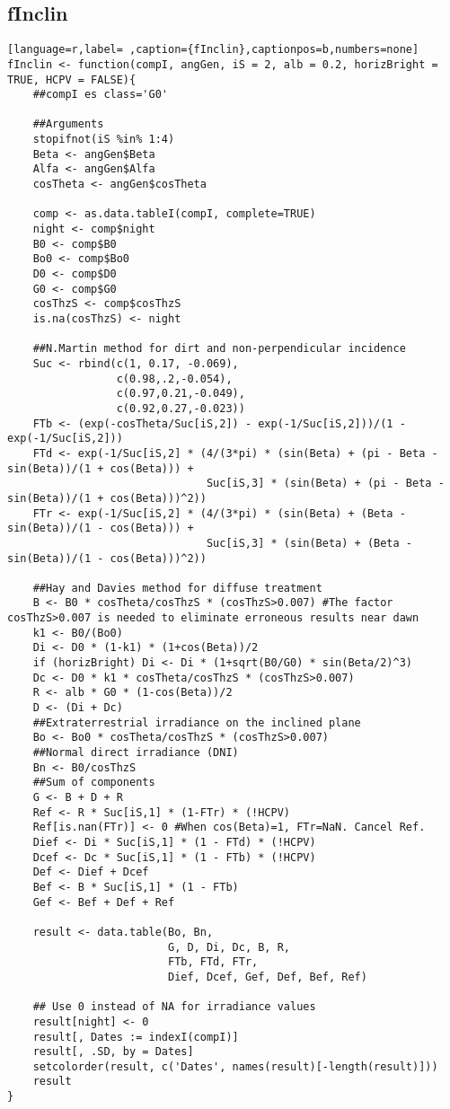 \subsection{fInclin}
\label{sec:org401130c}
\label{subsec:finclin}
\begin{lstlisting}[language=r,label= ,caption={fInclin},captionpos=b,numbers=none]
fInclin <- function(compI, angGen, iS = 2, alb = 0.2, horizBright = TRUE, HCPV = FALSE){
    ##compI es class='G0'

    ##Arguments
    stopifnot(iS %in% 1:4)
    Beta <- angGen$Beta
    Alfa <- angGen$Alfa
    cosTheta <- angGen$cosTheta

    comp <- as.data.tableI(compI, complete=TRUE)
    night <- comp$night
    B0 <- comp$B0
    Bo0 <- comp$Bo0
    D0 <- comp$D0
    G0 <- comp$G0
    cosThzS <- comp$cosThzS
    is.na(cosThzS) <- night

    ##N.Martin method for dirt and non-perpendicular incidence
    Suc <- rbind(c(1, 0.17, -0.069),
                 c(0.98,.2,-0.054),
                 c(0.97,0.21,-0.049),
                 c(0.92,0.27,-0.023))
    FTb <- (exp(-cosTheta/Suc[iS,2]) - exp(-1/Suc[iS,2]))/(1 - exp(-1/Suc[iS,2]))
    FTd <- exp(-1/Suc[iS,2] * (4/(3*pi) * (sin(Beta) + (pi - Beta - sin(Beta))/(1 + cos(Beta))) +
                               Suc[iS,3] * (sin(Beta) + (pi - Beta - sin(Beta))/(1 + cos(Beta)))^2))
    FTr <- exp(-1/Suc[iS,2] * (4/(3*pi) * (sin(Beta) + (Beta - sin(Beta))/(1 - cos(Beta))) +
                               Suc[iS,3] * (sin(Beta) + (Beta - sin(Beta))/(1 - cos(Beta)))^2))

    ##Hay and Davies method for diffuse treatment
    B <- B0 * cosTheta/cosThzS * (cosThzS>0.007) #The factor cosThzS>0.007 is needed to eliminate erroneous results near dawn
    k1 <- B0/(Bo0)
    Di <- D0 * (1-k1) * (1+cos(Beta))/2
    if (horizBright) Di <- Di * (1+sqrt(B0/G0) * sin(Beta/2)^3)
    Dc <- D0 * k1 * cosTheta/cosThzS * (cosThzS>0.007)
    R <- alb * G0 * (1-cos(Beta))/2
    D <- (Di + Dc)
    ##Extraterrestrial irradiance on the inclined plane
    Bo <- Bo0 * cosTheta/cosThzS * (cosThzS>0.007) 
    ##Normal direct irradiance (DNI)
    Bn <- B0/cosThzS
    ##Sum of components
    G <- B + D + R
    Ref <- R * Suc[iS,1] * (1-FTr) * (!HCPV)
    Ref[is.nan(FTr)] <- 0 #When cos(Beta)=1, FTr=NaN. Cancel Ref.
    Dief <- Di * Suc[iS,1] * (1 - FTd) * (!HCPV)
    Dcef <- Dc * Suc[iS,1] * (1 - FTb) * (!HCPV)
    Def <- Dief + Dcef
    Bef <- B * Suc[iS,1] * (1 - FTb)
    Gef <- Bef + Def + Ref

    result <- data.table(Bo, Bn,
                         G, D, Di, Dc, B, R,
                         FTb, FTd, FTr,
                         Dief, Dcef, Gef, Def, Bef, Ref) 

    ## Use 0 instead of NA for irradiance values
    result[night] <- 0
    result[, Dates := indexI(compI)]
    result[, .SD, by = Dates]
    setcolorder(result, c('Dates', names(result)[-length(result)]))
    result
}
\end{lstlisting}
